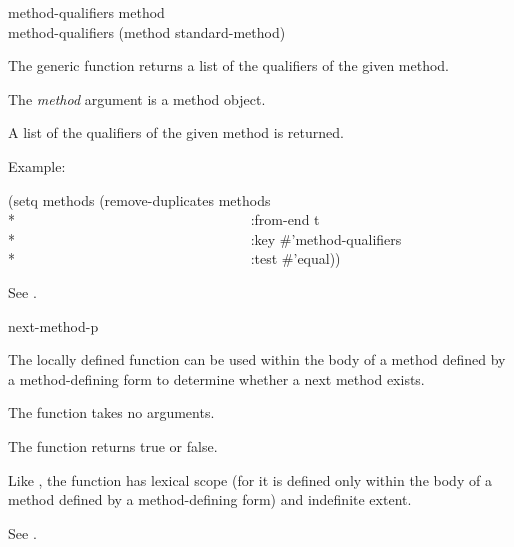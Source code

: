 \begin{defun}
method-qualifiers method \\
method-qualifiers (method standard-method)

The generic function  returns a list of the
qualifiers of the given method.





The {\it method\/} argument is a method object. 


A list of the qualifiers of the given method is returned.

Example:
\begin{lisp}
(setq methods (remove-duplicates methods \\*
~~~~~~~~~~~~~~~~~~~~~~~~~~~~~~~~~:from-end t \\*
~~~~~~~~~~~~~~~~~~~~~~~~~~~~~~~~~:key \#'method-qualifiers \\*
~~~~~~~~~~~~~~~~~~~~~~~~~~~~~~~~~:test \#'equal))
\end{lisp}

See .
\end{defun}

 

\begin{defun}[Function]
next-method-p

The locally defined function  can be used within
the body of a method defined by a method-defining form to determine
whether a next method exists.





The function  takes no arguments.


The function  returns true or false.


Like , the function  has 
lexical scope (for it
is defined only within the body of a method defined by a method-defining form)
and indefinite extent.

See .

\end{defun}


